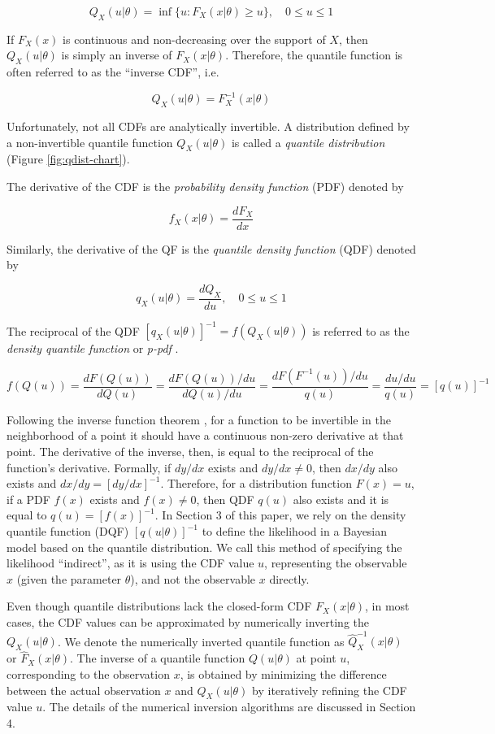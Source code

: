 \documentclass[
  12pt,
]{article}
\begin{document}
\[
Q_X(u | \theta)=\inf\{u:F_X(x|\theta)\geq u\}, \quad 0 \leq u\leq 1
\]

If \(F_X(x)\) is continuous and non-decreasing over the support of \(X\), then \(Q_X(u|\theta)\) is simply an inverse of \(F_X(x|\theta)\). Therefore, the quantile function is often referred to as the ``inverse CDF'', i.e.~

\[
Q_X(u | \theta)=F_X^{-1}(x|\theta)
\]

Unfortunately, not all CDFs are analytically invertible. A distribution defined by a non-invertible quantile function \(Q_X(u | \theta)\) is called a \emph{quantile distribution} (Figure \ref{fig:qdist-chart}).

The derivative of the CDF is the \emph{probability density function} (PDF) denoted by

\[
f_X(x | \theta)=\frac{dF_X}{dx}
\]

Similarly, the derivative of the QF is the \emph{quantile density function} (QDF) denoted by

\[
q_X(u|\theta)=\frac{dQ_X}{du}, \quad 0 \leq u \leq 1
\]

The reciprocal of the QDF \([q_X(u|\theta)]^{-1}=f(Q_X(u|\theta))\) is referred to as the \emph{density quantile function} \citep{parzen1980DataModelingUsing} or \emph{p-pdf} \citep{gilchrist2000StatisticalModellingQuantile}.

\[
f(Q(u))=\frac{dF(Q(u))}{dQ(u)} = \frac{dF(Q(u))/du}{dQ(u)/du}=\frac{dF(F^{-1}(u))/du}{q(u)}=\frac{du/du}{q(u)}=[q(u)]^{-1}
\]

Following the inverse function theorem \citep{price1984InverseFunctionTheorem}, for a function to be invertible in the neighborhood of a point it should have a continuous non-zero derivative at that point. The derivative of the inverse, then, is equal to the reciprocal of the function's derivative. Formally, if \(dy/dx\) exists and \(dy/dx \neq 0\), then \(dx/dy\) also exists and \(dx/dy=[dy/dx]^{-1}\). Therefore, for a distribution function \(F(x)=u\), if a PDF \(f(x)\) exists and \(f(x)\neq0\), then QDF \(q(u)\) also exists and it is equal to \(q(u)=[f(x)]^{-1}\). In Section 3 of this paper, we rely on the density quantile function (DQF) \([q(u|\theta)]^{-1}\) to define the likelihood in a Bayesian model based on the quantile distribution. We call this method of specifying the likelihood ``indirect'', as it is using the CDF value \(u\), representing the observable \(x\) (given the parameter \(\theta\)), and not the observable \(x\) directly.

Even though quantile distributions lack the closed-form CDF \(F_X(x|\theta)\), in most cases, the CDF values can be approximated by numerically inverting the \(Q_X(u|\theta)\). We denote the numerically inverted quantile function as \(\widehat{Q}^{-1}_X(x|\theta)\) or \(\widehat{F}_X(x|\theta)\). The inverse of a quantile function \(Q(u|\theta)\) at point \(u\), corresponding to the observation \(x\), is obtained by minimizing the difference between the actual observation \(x\) and \(Q_X(u|\theta)\) by iteratively refining the CDF value \(u\). The details of the numerical inversion algorithms are discussed in Section 4.
\end{document}
